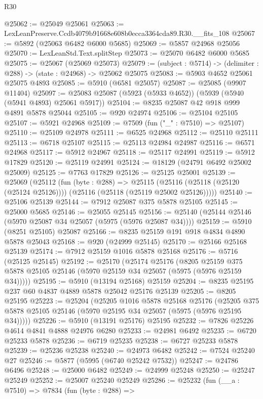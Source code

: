 \begin{lexlean}{R30}
\begin{coremodule}
@25062 := @25049 @25061
@25063 := LexLeanPreserve.Ccdb4079b91668e608b0ecca3364cda89.R30.__fits_108
@25067 := @5892 (@25063 @6482 @6000 @5685)
@25069 := @5857 @24968 @25056
@25070 := LexLeanStd.Text.splitStep
@25073 := @25070 @6482 @6000 @5685
@25075 := @25067 (@25069 @25073)
@25079 := (subject : @5714) -> (delimiter : @288) -> (state : @24968) -> @25062 @25075
@25083 := @5903 @4652 @25061 @25075 @4893
@25085 := @5910 (@6581 @25057)
@25087 := @25085 (@9907 @11404)
@25097 := @25083 @25087 (@5923 (@5933 @4652)) (@5939 (@5940 (@5941 @4893) @25061 @5917))
@25104 := @8235 @25087 @42 @918 @999 @4891 @5878 @25044
@25105 := @920 @24974
@25106 := @25104 @25105
@25107 := @5921 @24968
@25109 := @7509 (fun ("_" : @7510) => @25107)
@25110 := @25109 @24978
@25111 := @6525 @24968
@25112 := @25110 @25111
@25113 := @6718 @25107
@25115 := @25113 @24984 @24987
@25116 := @6571 @24968
@25117 := @5912 @24967
@25118 := @25117 @24991
@25119 := @5912 @17829
@25120 := @25119 @24991
@25124 := @18129 (@24791 @6492 @25002 @25009)
@25125 := @7763 @17829
@25126 := @25125 @25001
@25139 := @25069
    (@25112
      (fun (byte : @288) =>
      @25115 (@25116 (@25118 (@25120 (@25124 @25126)))) (@25116 (@25118 (@25119 @25002 @25126)))))
@25140 := @25106 @25139
@25144 := @7912 @25087 @375 @5878 @25105
@25145 := @25000 @5685
@25146 := @25055 @25145
@25156 := @25140 (@25144 @25146 (@5970 @25087 @34 @25057 (@5975 (@5976 @25087 @34))))
@25159 := @5910 (@8251 @25105) @25087
@25166 := @8235 @25159 @191 @918 @4834 @4890 @5878 @25043
@25168 := @920 (@24999 @25145)
@25170 := @25166 @25168 @25139
@25174 := @7912 @25159 @1016 @5878 @25168
@25176 := @5716 (@25125 @25145)
@25192 := @25170
    (@25174
      @25176
      (@8205 @25159 @375 @5878 @25105 @25146 (@5970 @25159 @34 @25057 (@5975 (@5976 @25159 @34)))))
@25195 := @5910 (@13194 @25168) @25159
@25204 := @8235 @25195 @237 @60 @4837 @4889 @5878 @25042 @25176 @25139
@25205 := @8205 @25195
@25223 := @25204
    (@25205
      @1016
      @5878
      @25168
      @25176
      (@25205 @375 @5878 @25105 @25146 (@5970 @25195 @34 @25057 (@5975 (@5976 @25195 @34)))))
@25226 := @5910 (@13191 @25176) @25195
@25232 := @7826 @25226 @4614 @4841 @4888 @24976 @6280
@25233 := @24981 @6492
@25235 := @6720 @25233 @5878
@25236 := @6719 @25235
@25238 := @6727 @25233 @5878
@25239 := @25236 @25238
@25240 := @24973 @6482
@25242 := @7524 @25240 @27
@25246 := @5877 (@5995 (@6740 @25242 @7532))
@25247 := @24786 @6496
@25248 := @25000 @6482
@25249 := @24999 @25248
@25250 := @25247 @25249
@25252 := @25007 @25240 @25249
@25286 := @25232
    (fun (__a : @7510) =>
    @7834
      (fun (byte : @288) =>

\end{coremodule}
\end{lexlean}
